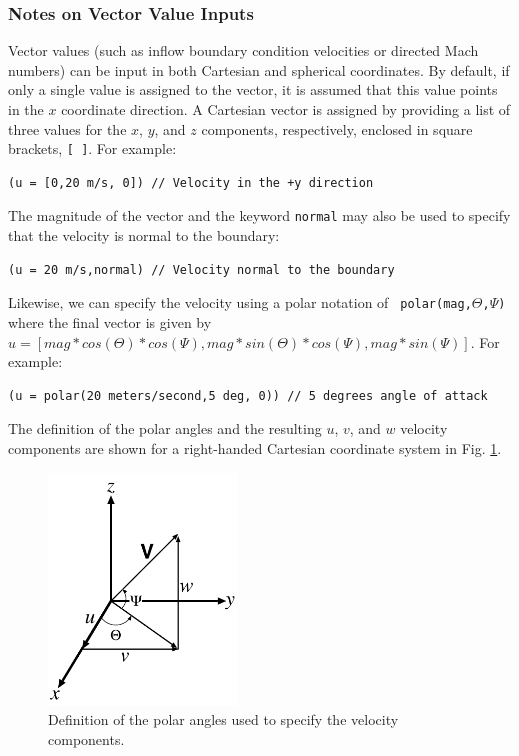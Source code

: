 \documentclass{article}
\begin{document}
\subsubsection{ Notes on Vector Value Inputs }

Vector values (such as inflow boundary condition velocities or directed Mach
numbers) can be input in both Cartesian and spherical coordinates.  By
default, if only a single value is assigned to the vector,
it is assumed that this value points in the $x$ coordinate
direction.  A Cartesian vector is assigned by providing a list of
three values for the $x$, $y$, and $z$ components, respectively, enclosed in square
brackets, {\tt [~]}.  For example:
\begin{verbatim}
(u = [0,20 m/s, 0]) // Velocity in the +y direction
\end{verbatim}
The magnitude of the vector and the keyword {\tt normal} may also
be used to specify that the velocity is normal to the boundary:
\begin{verbatim}
(u = 20 m/s,normal) // Velocity normal to the boundary
\end{verbatim}
Likewise, we can specify the velocity using a polar notation of {\tt
polar(mag,$\Theta$,$\Psi$)} where the final vector is given by $u =
\left[ mag*cos(\Theta)*cos(\Psi),mag*sin(\Theta)*cos(\Psi),mag*sin(\Psi)\right]$.
For example:
\begin{verbatim}
(u = polar(20 meters/second,5 deg, 0)) // 5 degrees angle of attack
\end{verbatim}
The definition of the polar angles and the resulting $u$, $v$, and $w$ velocity components are shown for a right-handed Cartesian coordinate system in Fig. \ref{polar}.

\begin{figure}[htbp]
\begin{center}
\includegraphics[width=5cm]{Figures/polar}
\caption{Definition of the polar angles used to specify the velocity components.}
\label{polar}
\end{center}
\end{figure}
\end{document}
